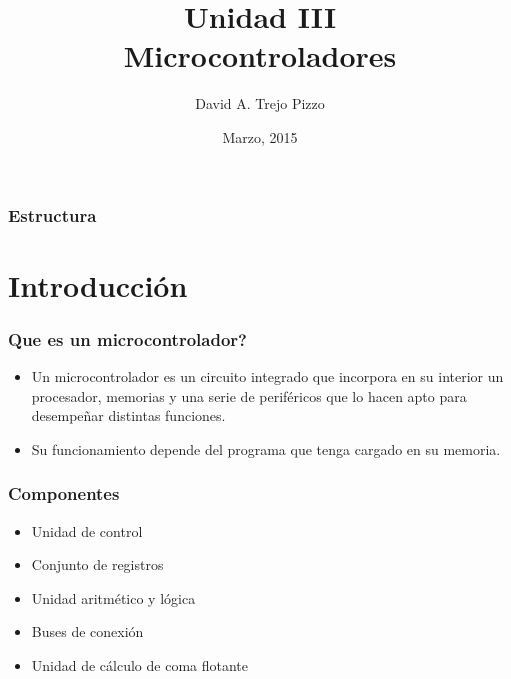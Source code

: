 \documentclass{beamer}
\title[Seminario de tecnologia]{Unidad III\\ Microcontroladores}
\author{David A. Trejo Pizzo}
\institute[Instituto Multimedial Da Vinci]
{Departamento de sistemas\\
\medskip
\textit{dtrejopizzo@gmail.com}}
\date{Marzo, 2015}
\begin{document}
\begin{frame}
\titlepage
\end{frame}


\begin{frame}
\frametitle{Estructura}
\tableofcontents
\end{frame}



\section{Introducción}

\begin{frame}
\frametitle{Que es un microcontrolador?}
\begin{itemize}
\item Un microcontrolador es un circuito integrado que incorpora en su interior un procesador, memorias y una serie de periféricos que lo hacen apto para desempeñar distintas funciones.
\item Su funcionamiento depende del programa que tenga cargado en su memoria.
\end{itemize}
\end{frame}

\begin{frame}
\frametitle{Componentes}
\begin{itemize}
\item Unidad de control
\item Conjunto de registros
\item Unidad aritmético y lógica
\item Buses de conexión
\item Unidad  de cálculo de coma flotante
\end{itemize}
\end{frame}
\end{document}
